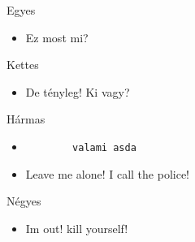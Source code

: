 \documentclass[aspectratio=169, bigger, xcolor={table}]{beamer}
\begin{document}
	\begin{frame}{Egyes}
		\begin{itemize}
		\item Ez most mi?
		\end{itemize}
	\end{frame}
	\begin{frame}{Kettes}
		\begin{itemize}
		\item De tényleg! Ki vagy?
		\end{itemize}
	\end{frame}
	\begin{frame}[fragile]{Hármas}
		\begin{itemize}
		\item{\begin{verbatim}
		valami asda
		\end{verbatim}}
		\item Leave me alone! I call the police!
		\end{itemize}
	\end{frame}
	\begin{frame}[allowframebreaks]{Négyes}
		\begin{itemize}
		\item Im out! kill yourself! \\
		\hulipsum[1-3]
		\end{itemize}
	\end{frame}
\end{document}
